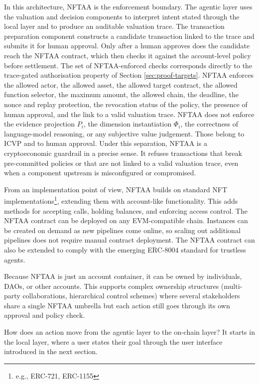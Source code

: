 In this architecture, NFTAA is the enforcement boundary. The agentic layer uses the valuation and decision components to interpret intent stated through the local layer and to produce an auditable valuation trace. The transaction preparation component constructs a candidate transaction linked to the trace and submits it for human approval. Only after a human approves does the candidate reach the NFTAA contract, which then checks it against the account-level policy before settlement. The set of NFTAA-enforced checks corresponds directly to the trace-gated authorisation property of Section \ref{sec:proof-targets}. NFTAA enforces the allowed actor, the allowed asset, the allowed target contract, the allowed function selector, the maximum amount, the allowed chain, the deadline, the nonce and replay protection, the revocation status of the policy, the presence of human approval, and the link to a valid valuation trace. NFTAA does not enforce the evidence projection $P_i$, the dimension instantiation $\Phi_i$, the correctness of language-model reasoning, or any subjective value judgement. Those belong to ICVP and to human approval. Under this separation, NFTAA is a cryptoeconomic guardrail in a precise sense. It refuses transactions that break pre-committed policies or that are not linked to a valid valuation trace, even when a component upstream is misconfigured or compromised.

From an implementation point of view, NFTAA builds on standard NFT implementations\footnote{e.g., ERC-721, ERC-1155}, extending them with account-like functionality. This adds methods for accepting calls, holding balances, and enforcing access control. The NFTAA contract can be deployed on any EVM-compatible chain. Instances can be created on demand as new pipelines come online, so scaling out additional pipelines does not require manual contract deployment. The NFTAA contract can also be extended to comply with the emerging ERC-8004 standard for trustless agents.

Because NFTAA is just an account container, it can be owned by individuals, DAOs, or other accounts. This supports complex ownership structures (multi-party collaborations, hierarchical control schemes) where several stakeholders share a single NFTAA umbrella but each action still goes through its own approval and policy check.

How does an action move from the agentic layer to the on-chain layer? It starts in the local layer, where a user states their goal through the user interface introduced in the next section.

